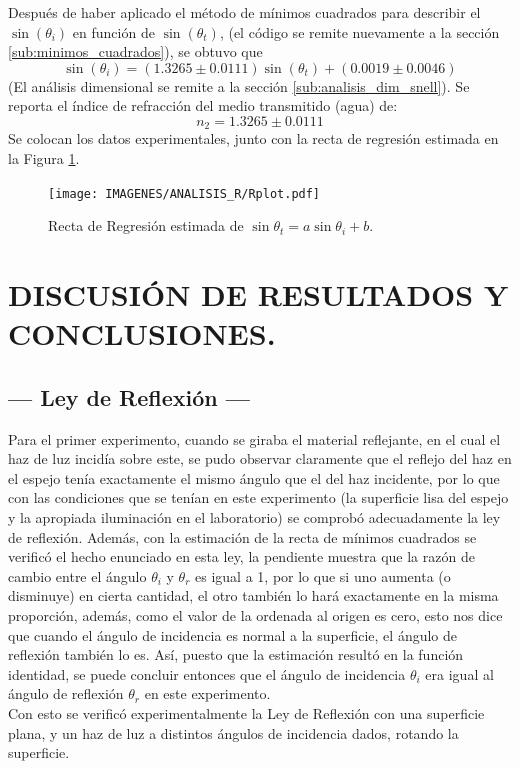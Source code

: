 \documentclass[12pt,a4paper]{article}
\begin{document}
Después de haber aplicado el método de mínimos cuadrados para describir el $\sin(\theta_i)$ en función de $\sin(\theta_t)$, (el código se remite nuevamente a la sección \ref{sub:minimos_cuadrados}), se obtuvo que
\begin{equation}
	\sin(\theta_i)=(1.3265 \pm 0.0111)\sin(\theta_t)+(0.0019 \pm 0.0046)
	\label{eq:ultima_ley_snell}
\end{equation}
(El análisis dimensional se remite a la sección \ref{sub:analisis_dim_snell}). Se reporta el índice de refracción del medio transmitido (agua) de:
\begin{equation}
	n_2 = 1.3265 \pm 0.0111
	\label{eq:indice_agua}
\end{equation}
Se colocan los datos experimentales, junto con la recta de regresión estimada en la Figura \ref{fig:comprobacion}.
\newpage
\begin{figure}[ht]
	\centering
	\texttt{[image: IMAGENES/ANALISIS\_R/Rplot.pdf]}
	\caption{Recta de Regresión estimada de \(\sin \theta _t = a \sin \theta _i+b\).}
	\label{fig:comprobacion}
\end{figure}


\section{DISCUSIÓN DE RESULTADOS Y CONCLUSIONES.} %

\subsection{--- Ley de Reflexión ---} %
\label{sub:ley_reflexion_conc}
Para el primer experimento, cuando se giraba el material reflejante, en el cual el haz de luz  incidía sobre este, se pudo observar claramente que el reflejo del haz en el espejo tenía exactamente el mismo ángulo que el del haz incidente, por lo que con las condiciones que se tenían en este experimento (la superficie lisa del espejo y la apropiada iluminación en el laboratorio) se comprobó adecuadamente la ley de reflexión. Además, con la estimación de la recta de mínimos cuadrados se verificó el hecho enunciado en esta ley, la pendiente muestra que la razón de cambio entre el ángulo $\theta_i$ y $\theta_r$ es igual a 1, por lo que si uno aumenta (o disminuye) en cierta cantidad, el otro también lo hará exactamente en la misma proporción, además, como el valor de la ordenada al origen es cero, esto nos dice que cuando el ángulo de incidencia es normal a la superficie, el ángulo de reflexión también lo es. Así, puesto que la estimación resultó en la función identidad, se puede concluir entonces que el ángulo de incidencia $\theta_i$ era igual al ángulo de reflexión $\theta_r$ en este experimento. \\[2mm]
Con esto se verificó experimentalmente la Ley de Reflexión con una superficie plana, y un haz de luz a distintos ángulos de incidencia dados, rotando la superficie.
\end{document}
